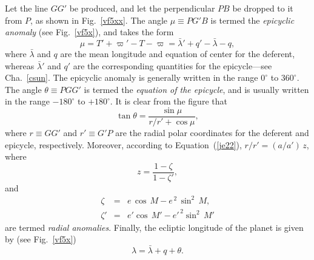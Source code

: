 Let the line $GG'$ be produced, and let the perpendicular $PB$ be
dropped to it from $P$, as shown in Fig.~\ref{vf5xx}. The angle $\mu\equiv PG'B$
is termed the {\em epicyclic anomaly}\/ (see Fig.~\ref{vf5x}), and takes the form
\begin{equation}
\mu =T'+\varpi' - T - \varpi = \bar{\lambda}' + q' - \bar{\lambda}-q,
\end{equation}
where $\bar{\lambda}$ and $q$ are the mean longitude and equation of center for the
deferent, whereas $\bar{\lambda}'$ and $q'$ are the corresponding quantities for  the
epicycle---see Cha.~\ref{csun}. The epicyclic anomaly is generally written in the 
range $0^\circ$ to $360^\circ$. 
 The angle $\theta\equiv PGG'$ is termed the {\em equation of the epicycle}, and is usually written in the range $-180^\circ$ to $+180^\circ$.
It is clear from the figure that
\begin{equation}
\tan\theta = \frac{\sin\mu}{r/r'+ \cos\mu},
\end{equation}
where $r\equiv GG'$ and $r'\equiv G'P$ are the radial polar coordinates for the deferent and epicycle,
respectively. 
Moreover, according to Equation~(\ref{je22}), $r/r' = (a/a')\,z$, where
\begin{equation}\label{ezdef}
z = \frac{1-\zeta}{1-\zeta'},
\end{equation}
and
\begin{eqnarray}
\zeta &=& e\,\cos\,M -e^{\,2}\,\sin^2\,M,\\[0.5ex]
\zeta' &=& e'\cos\,M' -e'^{\,2}\sin^2\,M'
\end{eqnarray}
are termed {\em radial anomalies}. 
Finally, the ecliptic longitude of the planet is given by  (see Fig.~\ref{vf5x})
\begin{equation}
\lambda = \bar{\lambda} + q + \theta.
\end{equation}

